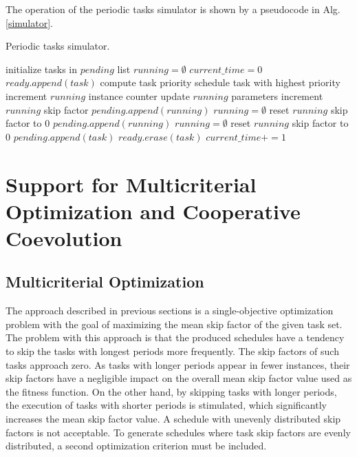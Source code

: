 The operation of the periodic tasks simulator is shown by a pseudocode in Alg. \ref{simulator}.
\begin{algorithm}
\caption{Periodic tasks simulator.\label{simulator}}
\begin{algorithmic}[1]
\State initialize tasks in $pending$ list
\State $running = \emptyset$
\State $current\_time = 0$
			\State $ready.append(task)$
		\EndIf
	\EndFor
		\State compute task priority
	\EndFor
	\State schedule task with highest priority
			\State increment $running$ instance counter
			\State update $running$ parameters
			\State increment $running$ skip factor
			\State $pending.append(running)$
			\State $running = \emptyset$
		\Else 
				\State reset $running$ skip factor to $0$
				\State $pending.append(running)$
				\State $running = \emptyset$ 
			\EndIf
		\EndIf
	\EndIf
			\State reset $running$ skip factor to $0$
			\State $pending.append(task)$
			\State $ready.erase(task)$
		\EndIf
	\EndFor
	\State $current\_time+=1$
\EndWhile
\end{algorithmic}
\end{algorithm}

\section{Support for Multicriterial Optimization and Cooperative Coevolution}
\subsection{Multicriterial Optimization}
The approach described in previous sections is a single-objective optimization problem with the goal of maximizing the mean skip factor of the given task set.
The problem with this approach is that the produced schedules have a tendency to skip the tasks with longest periods more frequently.
The skip factors of such tasks approach zero.
As tasks with longer periods appear in fewer instances, their skip factors have a negligible impact on the overall mean skip factor value used as the fitness function.
On the other hand, by skipping tasks with longer periods, the execution of tasks with shorter periods is stimulated, which significantly increases the mean skip factor value.
A schedule with unevenly distributed skip factors is not acceptable.
To generate schedules where task skip factors are evenly distributed, a second optimization criterion must be included.

